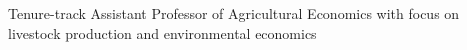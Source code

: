 
Tenure-track Assistant Professor of Agricultural Economics with focus on livestock production and environmental economics